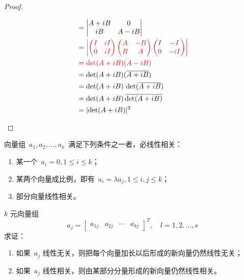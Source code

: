 \documentclass[twoside,openright]{book}
\begin{document}
\begin{CJK*}{UTF8}{}
\begin{proof}
\begin{enumerate}
\begin{align*}
&=
\begin{vmatrix}A+iB & 0 \\
iB & A-iB
\end{vmatrix} \\
&=
{\color{red}
\begin{vmatrix}
\begin{pmatrix} I & i I \\ 0 & i I \end{pmatrix}
\begin{pmatrix} A & -B \\ B & A \end{pmatrix}
\begin{pmatrix} I & - I \\ 0 & - i I \end{pmatrix}
\end{vmatrix}} \\
&=
{\color{red}\det(A + iB)(A-iB)} \\
&=
\det(A + iB)(\overline{A+iB}) \\
&=
\det(A + iB)\,\det(\overline{A+iB}) \\
&=
\det(A + iB)\,\overline{\det(A+iB)} \\
&= \lvert{\det(A + i B)}\rvert^2
\end{align*}
\end{enumerate}
\end{proof}


\begin{quest}
\label{quest:111}
向量组\ $a_1, a_2,\dots,a_k$\ 满足下列条件之一者，必线性相关：
\begin{enumerate}
\item
某一个\ $a_i = 0, 1 \leq i \leq k$；
\item
某两个向量成比例，即有\ $a_i = \lambda a_j, 1 \leq i, j \leq k$；
\item
部分向量线性相关。
\end{enumerate}
\end{quest}

\begin{quest}
\label{quest:112}
$k$ 元向量组
\[
a_j =
\begin{bmatrix}
a_{1j} & a_{2j} & \cdots & a_{kj}
\end{bmatrix}^T,\quad l=1,2,\dotsc,s
\]
求证：
\begin{enumerate}
\item
如果\ $a_j$ 线性无关，则把每个向量加长以后形成的新向量仍然线性无关；
\item
如果\ $a_j$ 线性相关，则由某部分分量形成的新向量仍然线性相关。
\end{enumerate}
\end{quest}


\end{CJK*}
\end{document}
